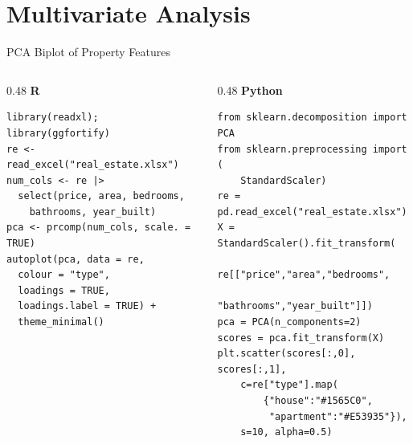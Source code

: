 \documentclass[10pt]{beamer}
\begin{document}
\section{Multivariate Analysis}
\begin{frame}[fragile]{PCA Biplot of Property Features}
\begin{columns}[T]
\begin{column}{0.48\textwidth}
\textbf{R}
\begin{lstlisting}[style=rstyle]
library(readxl); library(ggfortify)
re <- read_excel("real_estate.xlsx")
num_cols <- re |>
  select(price, area, bedrooms,
    bathrooms, year_built)
pca <- prcomp(num_cols, scale. = TRUE)
autoplot(pca, data = re,
  colour = "type",
  loadings = TRUE,
  loadings.label = TRUE) +
  theme_minimal()
\end{lstlisting}
\end{column}
\begin{column}{0.48\textwidth}
\textbf{Python}
\begin{lstlisting}[style=pythonstyle]
from sklearn.decomposition import PCA
from sklearn.preprocessing import (
    StandardScaler)
re = pd.read_excel("real_estate.xlsx")
X = StandardScaler().fit_transform(
    re[["price","area","bedrooms",
        "bathrooms","year_built"]])
pca = PCA(n_components=2)
scores = pca.fit_transform(X)
plt.scatter(scores[:,0], scores[:,1],
    c=re["type"].map(
        {"house":"#1565C0",
         "apartment":"#E53935"}),
    s=10, alpha=0.5)
\end{lstlisting}
\end{column}
\end{columns}
\end{frame}
\end{document}
